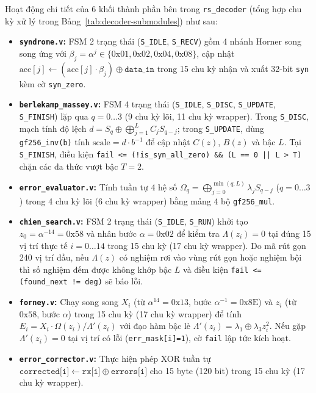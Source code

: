Hoạt động chi tiết của 6 khối thành phần bên trong \texttt{rs\_decoder} (tổng hợp chu kỳ xử lý trong Bảng~\ref{tab:decoder-submodules}) như sau:
\begin{itemize}
    \item \textbf{\texttt{syndrome.v}:} FSM 2 trạng thái (\texttt{S\_IDLE}, \texttt{S\_RECV}) gồm 4 nhánh Horner song song ứng với $\beta_j = \alpha^j \in \{0\text{x01}, 0\text{x02}, 0\text{x04}, 0\text{x08}\}$, cập nhật $\text{acc}[j] \leftarrow (\text{acc}[j]\cdot \beta_j) \oplus \texttt{data\_in}$ trong 15 chu kỳ nhận và xuất 32-bit \texttt{syn} kèm cờ \texttt{syn\_zero}.
    \item \textbf{\texttt{berlekamp\_massey.v}:} FSM 4 trạng thái (\texttt{S\_IDLE}, \texttt{S\_DISC}, \texttt{S\_UPDATE}, \texttt{S\_FINISH}) lặp qua $q=0\dots 3$ (9 chu kỳ lõi, 11 chu kỳ wrapper). Trong \texttt{S\_DISC}, mạch tính độ lệch $d = S_q \oplus \bigoplus_{j=1}^L C_j S_{q-j}$; trong \texttt{S\_UPDATE}, dùng \texttt{gf256\_inv(b)} tính $\text{scale} = d \cdot b^{-1}$ để cập nhật $C(z)$, $B(z)$ và bậc $L$. Tại \texttt{S\_FINISH}, điều kiện \texttt{fail <= (!is\_syn\_all\_zero) \&\& (L == 0 || L > T)} chặn các đa thức vượt bậc $T=2$.
    \item \textbf{\texttt{error\_evaluator.v}:} Tính tuần tự 4 hệ số $\Omega_q = \bigoplus_{j=0}^{\min(q,L)} \lambda_j S_{q-j}$ ($q=0\dots 3$) trong 4 chu kỳ lõi (6 chu kỳ wrapper) bằng mảng 4 bộ \texttt{gf256\_mul}.
    \item \textbf{\texttt{chien\_search.v}:} FSM 2 trạng thái (\texttt{S\_IDLE}, \texttt{S\_RUN}) khởi tạo $z_0 = \alpha^{-14} = \text{0x58}$ và nhân bước $\alpha = \text{0x02}$ để kiểm tra $\Lambda(z_i)=0$ tại đúng 15 vị trí thực tế $i=0\dots 14$ trong 15 chu kỳ (17 chu kỳ wrapper). Do mã rút gọn 240 vị trí đầu, nếu $\Lambda(z)$ có nghiệm rơi vào vùng rút gọn hoặc nghiệm bội thì số nghiệm đếm được không khớp bậc $L$ và điều kiện \texttt{fail <= (found\_next != deg)} sẽ báo lỗi.
    \item \textbf{\texttt{forney.v}:} Chạy song song $X_i$ (từ $\alpha^{14} = \text{0x13}$, bước $\alpha^{-1}=\text{0x8E}$) và $z_i$ (từ $\text{0x58}$, bước $\alpha$) trong 15 chu kỳ (17 chu kỳ wrapper) để tính $E_i = X_i \cdot \Omega(z_i)/\Lambda'(z_i)$ với đạo hàm bậc lẻ $\Lambda'(z_i) = \lambda_1 \oplus \lambda_3 z_i^2$. Nếu gặp $\Lambda'(z_i)=0$ tại vị trí có lỗi (\texttt{err\_mask[i]=1}), cờ \texttt{fail} lập tức kích hoạt.
    \item \textbf{\texttt{error\_corrector.v}:} Thực hiện phép XOR tuần tự $\texttt{corrected[i]} \leftarrow \texttt{rx[i]} \oplus \texttt{errors[i]}$ cho 15 byte (120 bit) trong 15 chu kỳ (17 chu kỳ wrapper).
\end{itemize}

